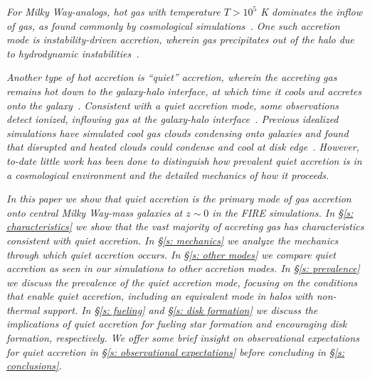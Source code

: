\documentclass[fleqn,usenatbib]{mnras}
\begin{document}
\textit{
For Milky Way-analogs, hot gas with temperature $T>10^5$ K dominates the inflow of gas, as found commonly by cosmological simulations~\citep{Faucher-Giguere2011a, VandeVoort2011, VandeVoort2012a, Joung2012, Murante2012, Nelson2013}.
One such accretion mode is instability-driven accretion, wherein gas precipitates out of the halo due to hydrodynamic instabilities~\citep[e.g.][]{Maller2004, Mccourt2012, Voit2015, Armillotta2016, Gronke2019a, Esmerian2020, Voit2021}.
}

\textit{
Another type of hot accretion is ``quiet'' accretion, wherein the accreting gas remains hot down to the galaxy-halo interface, at which time it cools and accretes onto the galaxy~\citep{Putman2012}.
Consistent with a quiet accretion mode, some observations detect ionized, inflowing gas at the galaxy-halo interface~\citep{Zheng2017}.
Previous idealized simulations have simulated cool gas clouds condensing onto galaxies and found that disrupted and heated clouds could condense and cool at disk edge~\citep{Heitsch2009}.
However, to-date little work has been done to distinguish how prevalent quiet accretion is in a cosmological environment and the detailed mechanics of how it proceeds.
}

\textit{
In this paper we show that quiet accretion is the primary mode of gas accretion onto central Milky Way-mass galaxies at $z \sim 0$ in the FIRE simulations.
In \S\ref{s: characteristics} we show that the vast majority of accreting gas has characteristics consistent with quiet accretion.
In \S\ref{s: mechanics} we analyze the mechanics through which quiet accretion occurs.
In \S\ref{s: other modes} we compare quiet accretion as seen in our simulations to other accretion modes.
In \S\ref{s: prevalence} we discuss the prevalence of the quiet accretion mode, focusing on the conditions that enable quiet accretion, including an equivalent mode in halos with non-thermal support.
In \S\ref{s: fueling} and \S\ref{s: disk formation} we discuss the implications of quiet accretion for fueling star formation and encouraging disk formation, respectively.
We offer some brief insight on observational expectations for quiet accretion in \S\ref{s: observational expectations} before concluding in \S\ref{s: conclusions}.
}


\end{document}
